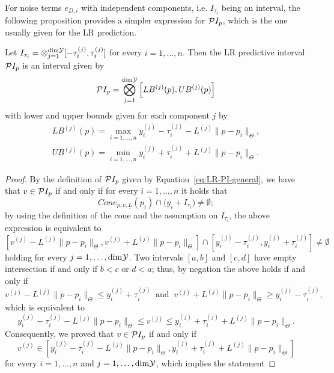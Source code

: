 For noise terms $e_{D,i}$ with independent components, i.e. $I_{\tau_i}$ being an interval, the following proposition provides a simpler expression for $\mathcal PI_p$, which is the one usually given for the LR prediction.
\begin{prp}\label{prp:LR-PI}
    Let $I_{\tau_i} = \otimes_{j=1}^{\text{dim}\mathcal Y} [ -\tau_i^{(j)}, \tau_i^{(j)} ]$ for every $i = 1, \dots, n$.
    Then the LR predictive interval $\mathcal PI_p$ is an interval given by
    \begin{equation}\label{eq:LR-PI}
        \mathcal PI_p = \bigotimes_{j=1}^{\text{dim}\mathcal Y} \left[ LB^{(j)}(p), UB^{(j)}(p)\right]
    \end{equation}
    with lower and upper bounds given for each component $j$ by
    \begin{equation} \label{LR-bounds}
    \begin{gathered}
        LB^{(j)}(p) = \max_{i=1,\dots,n} y_i^{(j)} - \tau_i^{(j)} - L^{(j)} \| p - p_i \|_\Theta, \\
        UB^{(j)}(p) = \min_{i=1,\dots,n} y_i^{(j)} + \tau_i^{(j)} + L^{(j)} \| p - p_i \|_\Theta.
    \end{gathered}
    \end{equation}
\end{prp}
\begin{proof}
    By the definition of $\mathcal PI_p$ given by Equation~\eqref{eq:LR-PI-general}, we have that $v\in \mathcal PI_p$ if and only if for every $i = 1, \dots, n$ it holds that
    \[
    Cone_{p,v,\underline L}(p_i) \cap  \big ( y_i + I_{\tau_i} \big ) \neq \emptyset;
    \]
    by using the definition of the cone and the assumption on $I_{\tau_i}$, the above expression is equivalent to 
    \[
        \left[ v^{(j)} - L^{(j)} \|p-p_i\|_\Theta, v^{(j)} + L^{(j)} \|p-p_i\|_\Theta \right] \cap  \left[ y_i^{(j)} - \tau_i^{(j)}, y_i^{(j)} + \tau_i^{(j)} \right] \neq \emptyset
    \]
    holding for every $j = 1, \dots, \text{dim} \mathcal Y$. \newline
    Two intervals $[a,b]$ and $[c,d]$ have empty intersection if and only if $b < c$ or $d < a$; thus, by negation the above holds if and only if
    \[
        v^{(j)} - L^{(j)} \|p-p_i\|_\Theta \leq y_i^{(j)} + \tau_i^{(j)} \ \text{ and } \ v^{(j)} + L^{(j)} \|p-p_i\|_\Theta \geq y_i^{(j)} - \tau_i^{(j)},
    \] which is equivalent to 
    \[
        y_i^{(j)} - \tau_i^{(j)} - L^{(j)} \|p-p_i\|_\Theta \leq v^{(j)} \leq y_i^{(j)} + \tau_i^{(j)} + L^{(j)} \|p-p_i\|_\Theta.
    \]
    Consequently, we proved that $v \in \mathcal PI_p$ if and only if
    \[
        v^{(j)} \in \left[ y_i^{(j)} - \tau_i^{(j)} - L^{(j)} \|p-p_i\|_\Theta, y_i^{(j)} + \tau_i^{(j)} + L^{(j)} \|p-p_i\|_\Theta \right]
    \]
    for every $i = 1, \dots, n$ and $j = 1, \dots, \text{dim} \mathcal Y$, which implies the statement
\end{proof}

